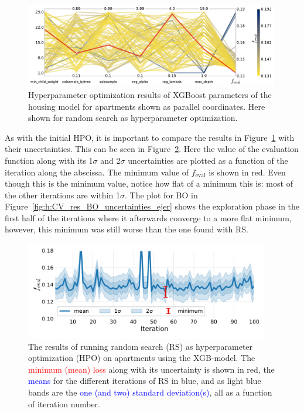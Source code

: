 \begin{figure}
  \centerfloat
  \includegraphics[width=0.99\textwidth, trim=0 0 0 0, clip]{figures/housing/Ejerlejlighed_v19_cut_all_Ncols_all_CV_viz_HPO_RS.pdf}
  \caption[XXX]
          {Hyperparameter optimization results of XGBoost parameters of the housing model for apartments shown as parallel coordinates. Here shown for random search as hyperparameter optimization.
          } 
  \label{fig:h:CV_res_RS_parallel_coords_ejer_non_appendix}
\end{figure}

As with the initial HPO, it is important to compare the results in Figure~\ref{fig:h:CV_res_RS_parallel_coords_ejer_non_appendix} with their uncertainties. This can be seen in Figure~\ref{fig:h:CV_res_RS_uncertainties_ejer}. Here the value of the evaluation function along with its \num{1}$\sigma$  and \num{2}$\sigma$ uncertainties are plotted as a function of the iteration along the abscissa. The minimum value of $f_\mathrm{eval}$ is shown in red. Even though this is the minimum value, notice how flat of a minimum this is: most of the other iterations are within \num{1}$\sigma$. The plot for BO in Figure~\ref{fig:h:CV_res_BO_uncertainties_ejer} shows the exploration phase in the first half of the iterations where it afterwards converge to a more flat minimum, however, this minimum was still worse than the one found with RS. 

\begin{figure}
  \centerfloat
  \includegraphics[width=0.95\textwidth, trim=0 0 0 0, clip]{figures/housing/Ejerlejlighed_v19_cut_all_Ncols_all_xgb_score_over_time_random.pdf}
  \caption[Hyperparameter optimization: random search results]
          {The results of running random search (RS) as hyperparameter optimization (HPO) on apartments using the XGB-model. The \textcolor{red}{minimum (mean) loss} along with its uncertainty is shown in red, the \textcolor{blue}{means} for the different iterations of RS in blue, and as light blue bands are the \textcolor{blue}{one (and two) standard deviation(s)}, all as a function of iteration number.} 
  \label{fig:h:CV_res_RS_uncertainties_ejer}
\end{figure}

